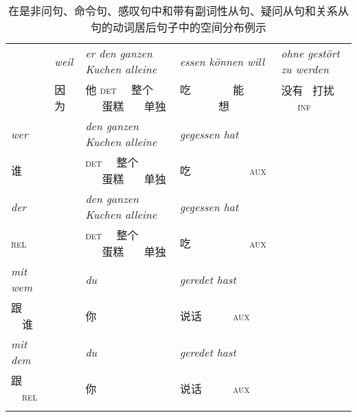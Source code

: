 \begin{table}
\begin{sideways}
{\begin{tabular}{l@{~}l@{~}l@{~}l@{~}l}
       & \emph{weil}          & \emph{er den ganzen Kuchen alleine}               & \emph{essen können will}   & \emph{ohne gestört zu werden}    \\
        & 因为       & 他 \textsc{det} \ \ 整个 \ \ \ 蛋糕 \ \ \  单独            & 吃 \ \ \ \ \ \ \  能 \ \ \ \ \ \ \ 想    & 没有 \  打扰 \ \ \ \textsc{inf} \passive{}\\%
%
\emph{wer}     &               & \emph{den ganzen Kuchen alleine}                  & \emph{gegessen hat} \\
谁     &               & \textsc{det} \ \ 整个 \ \ \ 蛋糕 \ \ \ 单独              & 吃 \ \ \ \  \ \ \ \ \ \ \textsc{aux}\\%
%
\emph{der}     &               & \emph{den ganzen Kuchen alleine}                  & \emph{gegessen hat} \\
\textsc{rel}     &               & \textsc{det} \ \ 整个 \ \ \ 蛋糕 \ \ \ 单独              & 吃 \ \ \ \ \ \ \ \ \ \ \textsc{aux}\\%
%
\emph{mit wem} &               & \emph{du}                                     & \emph{geredet hast}\\
跟 \ \ 谁 &             & 你                                    & 说话 \ \ \ \ \ \textsc{aux}\\%

\emph{mit dem} &               & \emph{du}                                     & \emph{geredet hast}\\
跟 \ \ \textsc{rel} &             & 你                                    & 说话 \ \ \ \ \  \textsc{aux}\\\lspbottomrule
\end{tabular}
}
\end{sideways}
\caption{\label{bsp-topo-two}在是非问句、命令句、感叹句中和带有副词性从句、疑问从句和关系从句的动词居后句子中的空间分布例示}
\end{table}
